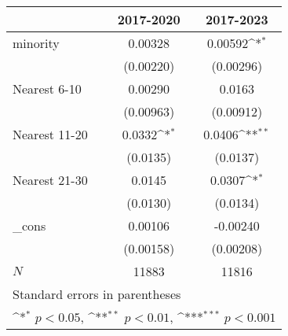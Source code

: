 {
\def\sym#1{\ifmmode^{#1}\else\(^{#1}\)\fi}
\begin{tabular}{l*{2}{c}}
\hline\hline
            &\multicolumn{1}{c}{2017-2020}&\multicolumn{1}{c}{2017-2023}\\
\hline
minority    &     0.00328         &     0.00592\sym{*}  \\
            &   (0.00220)         &   (0.00296)         \\
[1em]
Nearest 6-10&     0.00290         &      0.0163         \\
            &   (0.00963)         &   (0.00912)         \\
[1em]
Nearest 11-20&      0.0332\sym{*}  &      0.0406\sym{**} \\
            &    (0.0135)         &    (0.0137)         \\
[1em]
Nearest 21-30&      0.0145         &      0.0307\sym{*}  \\
            &    (0.0130)         &    (0.0134)         \\
[1em]
\_cons      &     0.00106         &    -0.00240         \\
            &   (0.00158)         &   (0.00208)         \\
\hline
\(N\)       &       11883         &       11816         \\
\hline\hline
\multicolumn{3}{l}{\footnotesize Standard errors in parentheses}\\
\multicolumn{3}{l}{\footnotesize \sym{*} \(p<0.05\), \sym{**} \(p<0.01\), \sym{***} \(p<0.001\)}\\
\end{tabular}
}
